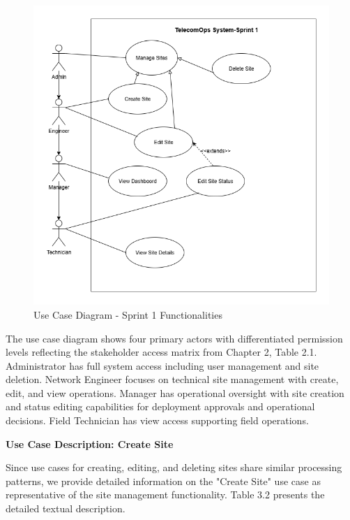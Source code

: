 \begin{figure}[H]
    \centering
    \includegraphics[width=0.85\linewidth]{img/chap_03/use_case_diagram_sprint1.png}
    \caption{Use Case Diagram - Sprint 1 Functionalities}
    \label{fig:use_case_diagram_sprint1}
\end{figure}

The use case diagram shows four primary actors with differentiated permission levels reflecting the stakeholder access matrix from Chapter 2, Table 2.1. Administrator has full system access including user management and site deletion. Network Engineer focuses on technical site management with create, edit, and view operations. Manager has operational oversight with site creation and status editing capabilities for deployment approvals and operational decisions. Field Technician has view access supporting field operations.

\textbf{Use Case Description: Create Site}

Since use cases for creating, editing, and deleting sites share similar processing patterns, we provide detailed information on the "Create Site" use case as representative of the site management functionality. Table 3.2 presents the detailed textual description.

